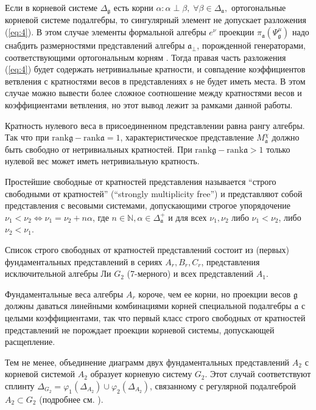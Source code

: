\documentclass[12pt]{article}
\newcommand{\pia}{\pi_{\mathfrak{a}}}
\newcommand{\gf}{\mathfrak{g}}
\newcommand{\af}{\mathfrak{a}}
\newcommand{\afb}{\mathfrak{a}_{\bot}}
\newcommand{\sfr}{\mathfrak{s}}
\begin{document}
Если в корневой системе  $\Delta_{\gf}$ есть корни $\alpha: \alpha\perp \beta,\; \forall \beta\in
\Delta_{\af},$ ортогональные корневой системе подалгебры, то сингулярный элемент не допускает
разложения (\ref{eq:4}).  В этом случае элементы формальной алгебры $e^{\nu}$ проекции
$\pia\left(\Psi^{\mu}_{\gf}\right)$ надо снабдить размерностями представлений алгебры $\afb$,
порожденной генераторами, соответствующими ортогональным корням \cite{2010arXiv1007.0318L}. Тогда
правая часть разложения (\ref{eq:4}) будет содержать нетривиальные кратности, и совпадение
коэффициентов ветвления с кратностями весов в представлениях  $\sfr$ не будет иметь места. В
этом случае можно вывести более сложное соотношение между кратностями весов и коэффициентами
ветвления, но этот вывод лежит за рамками данной работы. 

Кратность нулевого веса в присоединенном представлении равна рангу алгебры. Так что при 
$\mathrm{rank}\gf-\mathrm{rank}\af=1$, характеристическое представление  $M^{\chi}_{\af}$ должно
быть свободно от нетривиальных кратностей.  При $\mathrm{rank}\gf-\mathrm{rank}\af>1$ только нулевой
вес может иметь нетривиальную кратность. 

Простейшие свободные от кратностей представления называется ``строго свободными от кратностей''
 (``strongly multiplicity free'') \cite{lehrer2006strongly} и представляют собой представления с
 весовыми системами, допускающими строгое упорядочение $\nu_{1}<\nu_{2} \Leftrightarrow
 \nu_{1}=\nu_{2}+n \alpha$, где $n\in
\mathbb{N}, \alpha\in \Delta^{+}_{\af}$ и для всех $\nu_{1},\nu_{2}$ либо $\nu_{1}<\nu_{2}$, либо
$\nu_{2}<\nu_{1}$.

Список строго свободных от кратностей представлений состоит из (первых) фундаментальных
представлений в сериях $A_{r}, B_{r}, C_{r}$, представления исключительной алгебры Ли $G_{2}$
(7-мерного) и всех представлений $A_{1}$. 

Фундаментальные веса алгебры $A_{r}$ короче, чем ее корни, но проекции весов $\gf$ должны даваться
линейными комбинациями корней специальной подалгебры  $\af$ с целыми коэффициентами, так что первый
класс строго свободных от кратностей представлений не порождает проекции корневой системы,
допускающей расщепление.

Тем не менее, объединение диаграмм двух фундаментальных представлений  $A_{2}$ с корневой системой
$A_{2}$ образует корневую систему $G_{2}$. Этот случай соответствуют сплинту
$\Delta_{G_{2}}=\varphi_{1}( \Delta_{A_{2}})\cup \varphi_{2}(\Delta_{A_{2}})$, связанному с
регулярной подалгеброй $A_{2}\subset G_{2}$ (подробнее см. \cite{2011arXiv1111.6787L}).
\end{document}
